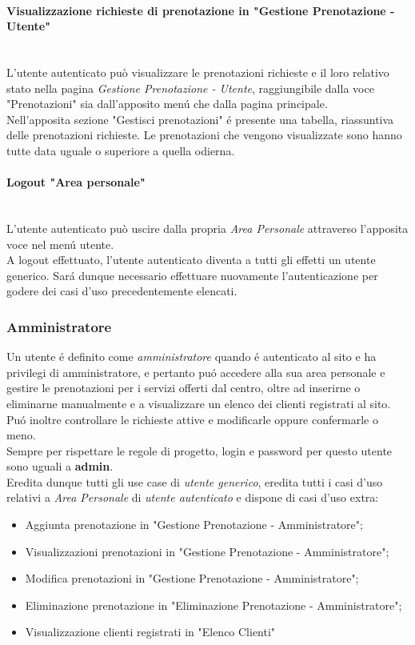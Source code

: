 \documentclass[]{article}
\begin{document}
\paragraph{Visualizzazione richieste di prenotazione in "Gestione Prenotazione - Utente"}\mbox{}\\
L'utente autenticato può visualizzare le prenotazioni richieste e il loro relativo stato nella pagina \textit{Gestione Prenotazione - Utente}, raggiungibile dalla voce "Prenotazioni" sia dall'apposito menú che dalla pagina principale.\\
Nell'apposita sezione "Gestisci prenotazioni" é presente una tabella, riassuntiva delle prenotazioni richieste. Le prenotazioni che vengono visualizzate sono hanno tutte data uguale o superiore a quella odierna.

\paragraph{Logout "Area personale"}\mbox{}\\
L'utente autenticato può uscire dalla propria \textit{Area Personale} attraverso l'apposita voce nel menú utente.\\
A logout effettuato, l'utente autenticato diventa a tutti gli effetti un utente generico. Sará dunque necessario effettuare nuovamente l'autenticazione per godere dei casi d'uso precedentemente elencati.

\subsubsection{Amministratore}
Un utente é definito come \textit{amministratore} quando é autenticato al sito e ha privilegi di amministratore, e pertanto puó accedere alla sua area personale e gestire le prenotazioni per i servizi offerti dal centro, oltre ad inserirne o eliminarne manualmente e a visualizzare un elenco dei clienti registrati al sito. Puó inoltre controllare le richieste attive e modificarle oppure confermarle o meno.\\
Sempre per rispettare le regole di progetto, login e password per questo utente sono uguali a \textbf{admin}.\\
Eredita dunque tutti gli use case di \textit{utente generico}, eredita tutti i casi d'uso relativi a \textit{Area Personale} di \textit{utente autenticato} e dispone di casi d'uso extra:
\begin{itemize}
	\item Aggiunta prenotazione in "Gestione Prenotazione - Amministratore";
	\item Visualizzazioni prenotazioni in "Gestione Prenotazione - Amministratore";
	\item Modifica prenotazioni in "Gestione Prenotazione - Amministratore";
 	\item Eliminazione prenotazione in "Eliminazione Prenotazione - Amministratore";
 	\item Visualizzazione clienti registrati in "Elenco Clienti"
\end{itemize}
\end{document}
